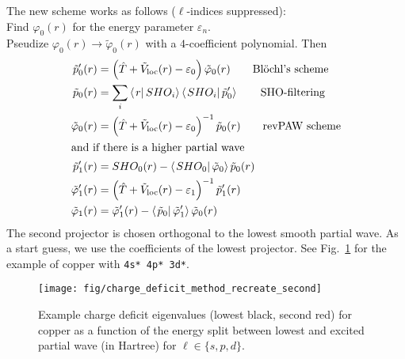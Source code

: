 \documentclass[oribibl]{llncs}
\newcommand{\um}[1]{_{\mathrm{#1}}}
\newcommand{\ttt}[1]{\texttt{#1}}
\newcommand{\braket}[2]{\left\langle \left. #1 \right| #2 \right\rangle}
\begin{document}
The new scheme works as follows ($\ell$-indices suppressed): \\
Find $\varphi_{0}(r)$ for the energy parameter $\varepsilon_{n}$.\\
Pseudize $\varphi_{0}(r) \longrightarrow \tilde \varphi_{0}(r)$ with a $4$-coefficient polynomial. Then\\
\begin{align}
	\tilde p'_{0}(r) &= \left( \hat T + \tilde V\um{loc}(r) - \varepsilon_0 \right)  \tilde \varphi_{0}(r)
    \qquad \text{Bl\"{o}chl's scheme} \\
	\tilde p_{0}(r) &= \sum_i \braket{r}{SHO_i}\braket{SHO_i}{\tilde p'_0} 
	\qquad \text{SHO-filtering} \\
	\tilde \varphi_0(r) &= \left( \hat T + \tilde V\um{loc}(r) - \varepsilon_0 \right)^{-1} \tilde p_0(r)
	\qquad \text{revPAW scheme} \\
	\intertext{and if there is a higher partial wave}
	\tilde p'_1(r) &= SHO_0(r) - \braket{SHO_0}{\tilde \varphi_0} \tilde p_0(r) \\
	\tilde \varphi'_1(r) &= \left( \hat T + \tilde V\um{loc}(r) - \varepsilon_1 \right)^{-1} \tilde p'_1(r) \\
	\tilde \varphi_1(r)  &= \tilde \varphi'_1(r) - \braket{\tilde p_0}{\tilde \varphi'_1} \tilde \varphi_0(r) \\
\end{align}
The second projector is chosen orthogonal to the lowest smooth partial wave. As a start guess, we use the coefficients
of the lowest projector. See Fig.~\ref{fig:charge-deficit-copper-recreate-second} for the example of copper with \ttt{4s* 4p* 3d*}.

\begin{figure} [h]
  \centering
  \begin{minipage}[c]{.990\textwidth}
	\texttt{[image: fig/charge\_deficit\_method\_recreate\_second]} %
  \end{minipage}\hfill
  \begin{minipage}[c]{.009\textwidth}
  \end{minipage}
  \caption{Example charge deficit eigenvalues (lowest black, second red) for copper as a function of the energy split between lowest and excited partial wave (in Hartree) for $\ell \in \{s, p, d\}$.} \label{fig:charge-deficit-copper-recreate-second}
\end{figure}


\newpage




\end{document}
